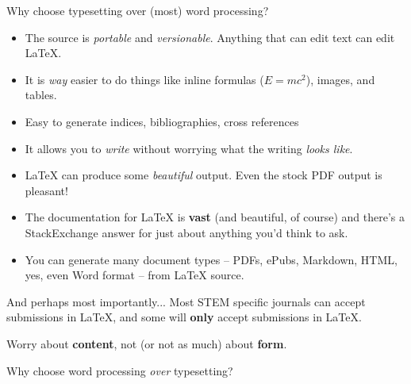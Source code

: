 \documentclass{beamer}
\begin{document}
\begin{frame}
	Why choose typesetting over (most) word processing?
	\begin{itemize}
		\item The source is \textit{portable} and \textit{versionable}. Anything that can edit text can edit \LaTeX.
		\pause
		\item It is \textit{way} easier to do things like inline formulas ($E=mc^2$), images, and tables.
		\pause
		\item Easy to generate indices, bibliographies, cross references
		\pause 
		\item It allows you to \textit{write} without worrying what the writing \textit{looks like}.
		\pause
		\item \LaTeX{} can produce some \textit{beautiful} output. Even the stock PDF output is pleasant!
		\pause
		\item The documentation for \LaTeX{} is \textbf{vast} (and beautiful, of course) and there's a StackExchange answer for just about anything you'd think to ask.
		\pause
		\item You can generate many document types -- PDFs, ePubs, Markdown, HTML, yes, even Word format -- from \LaTeX{} source.
	\end{itemize}
	

\end{frame}

\begin{frame}{And perhaps most importantly...}
	Most STEM specific journals can accept submissions in \LaTeX, and some will \textbf{only} accept submissions in \LaTeX.
\end{frame}

\begin{frame}
	Worry about \textbf{content}, not (or not as much) about \textbf{form}.
\end{frame}


\begin{frame}
	Why choose word processing \textit{over} typesetting?
\end{frame}
\end{document}
